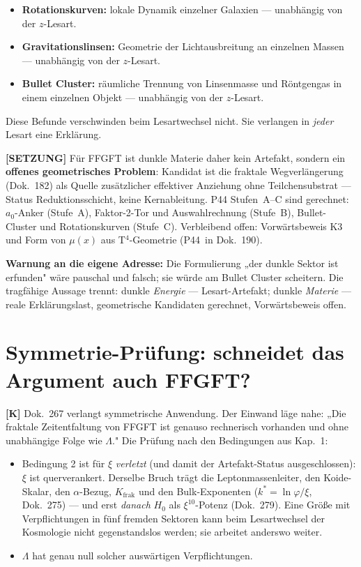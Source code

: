 \documentclass[11pt]{report}
\begin{document}
\begin{itemize}
  \item \textbf{Rotationskurven:} lokale Dynamik einzelner Galaxien —
        unabhängig von der $z$-Lesart.
  \item \textbf{Gravitationslinsen:} Geometrie der Lichtausbreitung an
        einzelnen Massen — unabhängig von der $z$-Lesart.
  \item \textbf{Bullet Cluster:} räumliche Trennung von Linsenmasse und
        Röntgengas in einem einzelnen Objekt — unabhängig von der
        $z$-Lesart.
\end{itemize}

Diese Befunde verschwinden beim Lesartwechsel nicht. Sie verlangen in
\emph{jeder} Lesart eine Erklärung.

\medskip
\noindent\textbf{[SETZUNG]} Für FFGFT ist dunkle Materie daher kein Artefakt, sondern ein
\textbf{offenes geometrisches Problem}: Kandidat ist die fraktale
Wegverlängerung (Dok.~182) als Quelle zusätzlicher effektiver
Anziehung ohne Teilchensubstrat — Status Reduktionsschicht, keine
Kernableitung. P44 Stufen~A–C sind gerechnet: $a_0$-Anker (Stufe~A),
Faktor-2-Tor und Auswahlrechnung (Stufe~B), Bullet-Cluster und
Rotationskurven (Stufe~C). Verbleibend offen: Vorwärtsbeweis K3 und
Form von $\mu(x)$ aus T$^4$-Geometrie (P44~in Dok.~190).

\medskip
\noindent\textbf{Warnung an die eigene Adresse:} Die Formulierung „der
dunkle Sektor ist erfunden" wäre pauschal und falsch; sie würde am
Bullet Cluster scheitern. Die tragfähige Aussage trennt: dunkle
\emph{Energie} — Lesart-Artefakt; dunkle \emph{Materie} — reale
Erklärungslast, geometrische Kandidaten gerechnet, Vorwärtsbeweis offen.

\chapter{Symmetrie-Prüfung: schneidet das Argument auch FFGFT?}

\textbf{[K]} Dok.~267 verlangt symmetrische Anwendung. Der Einwand läge nahe:
„Die fraktale Zeitentfaltung von FFGFT ist genauso rechnerisch
vorhanden und ohne unabhängige Folge wie $\Lambda$." Die Prüfung nach
den Bedingungen aus Kap.~1:

\begin{itemize}
  \item Bedingung 2 ist für $\xi$ \emph{verletzt} (und damit der
        Artefakt-Status ausgeschlossen): $\xi$ ist querverankert.
        Derselbe Bruch trägt die Leptonmassenleiter, den Koide-Skalar,
        den $\alpha$-Bezug, $K_\text{frak}$ und den Bulk-Exponenten
        ($k^* = \ln\varphi/\xi$, Dok.~275) — und erst \emph{danach}
        $H_0$ als $\xi^{10}$-Potenz (Dok.~279). Eine Größe mit
        Verpflichtungen in fünf fremden Sektoren kann beim
        Lesartwechsel der Kosmologie nicht gegenstandslos werden;
        sie arbeitet anderswo weiter.
  \item $\Lambda$ hat genau null solcher auswärtigen Verpflichtungen.
\end{itemize}
\end{document}
